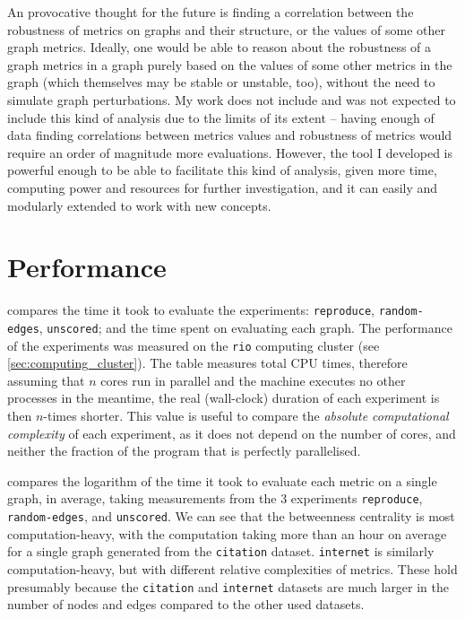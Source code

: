 An provocative thought for the future is finding a correlation between the robustness of metrics on graphs and their structure, or the values of some other graph metrics.
Ideally, one would be able to reason about the robustness of a graph metrics in a graph purely based on the values of some other metrics in the graph (which themselves may be stable or unstable, too), without the need to simulate graph perturbations.
My work does not include and was not expected to include this kind of analysis due to the limits of its extent -- having enough of data finding correlations between metrics values and robustness of metrics would require an order of magnitude more evaluations.
However, the \graffs tool I developed is powerful enough to be able to facilitate this kind of analysis, given more time, computing power and resources for further investigation, and it can easily and modularly extended to work with new concepts.

\section{Performance}



 compares the time it took to evaluate the experiments: \texttt{reproduce}, \texttt{random-edges}, \texttt{unscored}; and the time spent on evaluating each graph.
The performance of the experiments was measured on the \texttt{rio} computing cluster (see \autoref{sec:computing_cluster}).
The table measures total CPU times, therefore assuming that $n$ cores run in parallel and the machine executes no other processes in the meantime, the real (wall-clock) duration of each experiment is then $n$-times shorter.
This value is useful to compare the \textsl{absolute computational complexity} of each experiment, as it does not depend on the number of cores, and neither the fraction of the program that is perfectly parallelised.

 compares the logarithm of the time it took to evaluate each metric on a single graph, in average, taking measurements from the 3 experiments \texttt{reproduce}, \texttt{random-edges}, and \texttt{unscored}.
We can see that the betweenness centrality is most computation-heavy, with the computation taking more than an hour on average for a single graph generated from the \texttt{citation} dataset.
\texttt{internet} is similarly computation-heavy, but with different relative complexities of metrics.
These hold presumably because the \texttt{citation} and \texttt{internet} datasets are much larger in the number of nodes and edges compared to the other used datasets.

\bigskip





